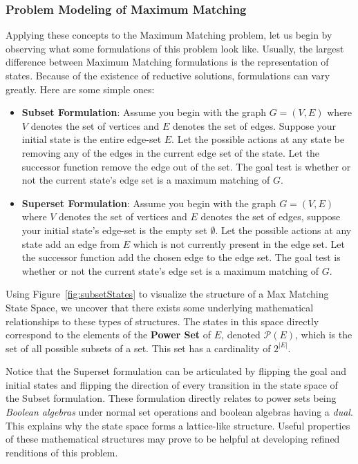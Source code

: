 \subsubsection{Problem Modeling of Maximum Matching}
Applying these concepts to the Maximum Matching problem, let us begin by observing what some formulations of this problem look like. Usually, the largest difference between Maximum Matching formulations is the representation of states. Because of the existence of reductive solutions, formulations can vary greatly. Here are some simple ones:
\begin{itemize}
    \item \textbf{Subset Formulation}: Assume you begin with the graph $G=(V,E)$ where $V$ denotes the set of vertices and $E$ denotes the set of edges.
Suppose your initial state is the entire edge-set $E$.
Let the possible actions at any state be removing any of the edges in the current edge set of the state. Let the successor function remove the edge out of the set. 
The goal test is whether or not the current state's edge set is a maximum matching of $G$. 
\item \textbf{Superset Formulation}: Assume you begin with the graph $G=(V,E)$ where $V$ denotes the set of vertices and $E$ denotes the set of edges, suppose your initial state's edge-set is the empty set $\emptyset$.
Let the possible actions at any state add an edge from $E$ which is not currently present in the edge set. Let the successor function add the chosen edge to the edge set. 
The goal test is whether or not the current state's edge set is a maximum matching of $G$. 
\end{itemize}


\noindent Using Figure~\ref{fig:subsetStates} to visualize the structure of a Max Matching State Space, we uncover that there exists some underlying mathematical relationships to these types of structures. The states in this space directly correspond to the elements of the \textbf{Power Set} of $E$, denoted $\mathcal{P}(E)$, which is the set of all possible subsets of a set. This set has a cardinality of $2^{|E|}$.

Notice that the Superset formulation can be articulated by flipping the goal and initial states and flipping the direction of every transition in the state space of the Subset formulation. These formulation directly relates to power sets being \textit{Boolean algebras} under normal set operations and boolean algebras having a \textit{dual}. This explains why the state space forms a lattice-like structure. Useful properties of these mathematical structures may prove to be helpful at developing refined renditions of this problem.

